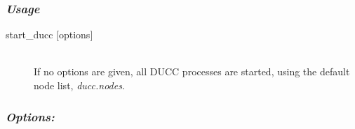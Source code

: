     \subsubsection{{\em Usage}}

    \begin{description}
      \item[start\_ducc {[options]}] \hfill \\ 
        If no options are given, all DUCC processes are started, using the default node list, 
        {\em ducc.nodes}. 
      
      \end{description}
      
      \subsubsection{{\em Options: }}
